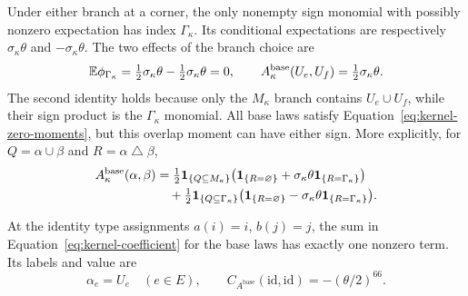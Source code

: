Under either branch at a corner, the only nonempty sign monomial with
possibly nonzero expectation has index $\Gamma_\kappa$. Its conditional
expectations are respectively $\sigma_\kappa\theta$ and
$-\sigma_\kappa\theta$. The two effects of the branch choice are
\begin{equation}
 \mathbb E\phi_{\Gamma_\kappa}
 =\tfrac12\sigma_\kappa\theta-\tfrac12\sigma_\kappa\theta=0,
 \qquad
 A^{\mathrm{base}}_\kappa(U_e,U_f)
 =\tfrac12\sigma_\kappa\theta.
 \label{eq:kernel-branch-biases}
\end{equation}
The second identity holds because only the \(M_\kappa\) branch
contains \(U_e\cup U_f\), while their sign product is the
\(\Gamma_\kappa\) monomial. All base laws satisfy
Equation~\eqref{eq:kernel-zero-moments}, but this overlap moment can
have either sign.
More explicitly, for $Q=\alpha\cup\beta$ and
$R=\alpha\mathbin\triangle\beta$,
\begin{align}
 A^{\mathrm{base}}_\kappa(\alpha,\beta)
 &=\tfrac12\mathbf 1_{\{Q\subseteq M_\kappa\}}
       \bigl(\mathbf 1_{\{R=\varnothing\}}
                +\sigma_\kappa\theta\mathbf 1_{\{R=\Gamma_\kappa\}}\bigr)
 \notag\\
 &\quad+\tfrac12\mathbf 1_{\{Q\subseteq\Gamma_\kappa\}}
       \bigl(\mathbf 1_{\{R=\varnothing\}}
                -\sigma_\kappa\theta\mathbf 1_{\{R=\Gamma_\kappa\}}\bigr).
 \label{eq:kernel-base-moment}
\end{align}

\begin{lemma}
\label{lem:kernel-support}
At the identity type assignments $a(i)=i$, $b(j)=j$, the sum in
Equation~\eqref{eq:kernel-coefficient} for the base laws has exactly one
nonzero term. Its labels and value are
\begin{equation}
 \alpha_e=U_e\quad(e\in E),\qquad
 C_{A^{\mathrm{base}}}(\mathrm{id},\mathrm{id})
 =-(\theta/2)^{66}.
 \label{eq:kernel-negative-term}
\end{equation}
\end{lemma}

